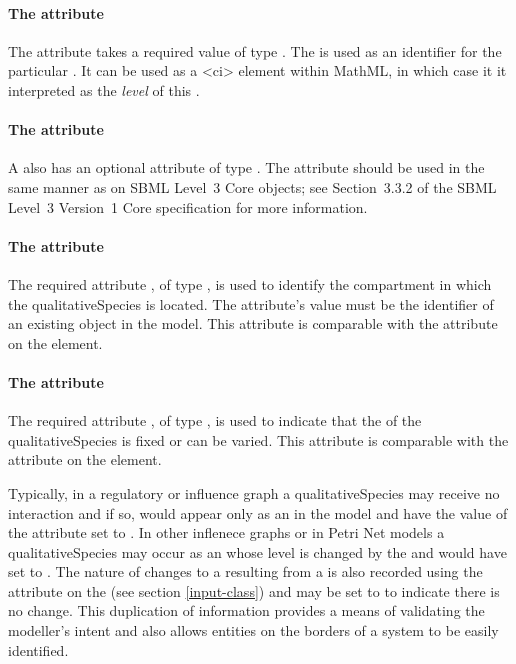 \paragraph{The \fixttspace{} attribute}

The  attribute takes a required value
of type . The  is used as an identifier for the particular \QualitativeSpecies. It can be used as a 
<ci> element within MathML, in which case it it interpreted as the \emph{level} of this \QualitativeSpecies.

\paragraph{The \fixttspace{} attribute}

A \QualitativeSpecies also has an optional  attribute of type . 
 The  attribute should be used
in the same manner as on SBML Level~3 Core
objects; see Section~3.3.2 of the SBML Level~3 Version~1 Core
specification for more information.


\paragraph{The  attribute}
The required attribute , of type , is used to identify the compartment in which the qualitativeSpecies is located.  The attribute's value must be the identifier of an existing  object in the model.  This attribute is comparable with the  attribute on the  element.

\paragraph{The  attribute}
The required attribute , of type , is used to indicate that the  of the qualitativeSpecies is fixed or can be varied. This attribute is comparable with the  attribute on the  element.

Typically, in a regulatory or influence graph a qualitativeSpecies may receive no interaction and if so, would appear only as an \Input in the model and have the value of the  attribute set to . In other inflenece graphs or in Petri Net models a qualitativeSpecies may occur as an \Input whose level is changed by the \Transition and would have  set to .  The nature of changes to a \QualitativeSpecies resulting from a \Transition is also recorded using the  attribute on the \Input (see section \ref{input-class}) and may be set to  to indicate there is no change. This duplication of information provides a means of validating the modeller's intent and also allows entities on the borders of a system to be easily identified.
 


